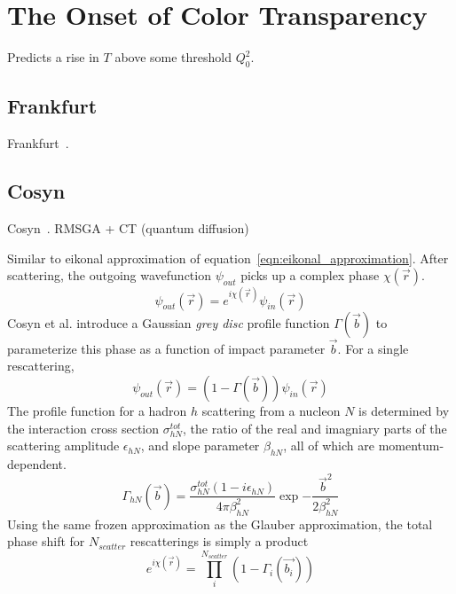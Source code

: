\section{The Onset of Color Transparency}
Predicts a rise in $T$ above some threshold $Q^2_0$.

\subsection{Frankfurt}
Frankfurt~\cite{Frankfurt_1995_PRC}.

\subsection{Cosyn}
Cosyn~\cite{Cosyn_2006}. RMSGA + CT (quantum diffusion)

Similar to eikonal approximation of equation~\ref{eqn:eikonal_approximation}.
After scattering, the outgoing wavefunction $\psi_{out}$ picks up a complex
phase $\chi(\vec{r})$.
\begin{equation}
    \psi_{out}(\vec{r}) = e^{i\chi(\vec{r})} \psi_{in}(\vec{r})
\end{equation}
Cosyn et al. introduce a Gaussian \textit{grey disc} profile function
$\Gamma(\vec{b})$ to parameterize this phase as a function of impact parameter
$\vec{b}$.
For a single rescattering,
\begin{equation}
    \psi_{out}(\vec{r}) = (1-\Gamma(\vec{b})) \psi_{in}(\vec{r})
\end{equation}
The profile function for a hadron $h$ scattering from a nucleon $N$ is
determined by
the interaction cross section $\sigma_{hN}^{tot}$,
the ratio of the real and imagniary parts of the scattering amplitude $\epsilon_{hN}$,
and
slope parameter $\beta_{hN}$,
all of which are momentum-dependent.
\begin{equation}
    \Gamma_{hN}(\vec{b}) =
        \frac{\sigma_{hN}^{tot}(1-i\epsilon_{hN})}
             {4\pi\beta_{hN}^2}
        \exp{-\frac{\vec{b}^2}{2\beta_{hN}^2}}
\end{equation}
Using the same frozen approximation as the Glauber approximation, the total
phase shift for $N_{scatter}$ rescatterings is simply a product
\begin{equation}
    e^{i\chi(\vec{r})} = \prod_i^{N_{scatter}} \left(1-\Gamma_i(\vec{b_i})\right)
\end{equation}


